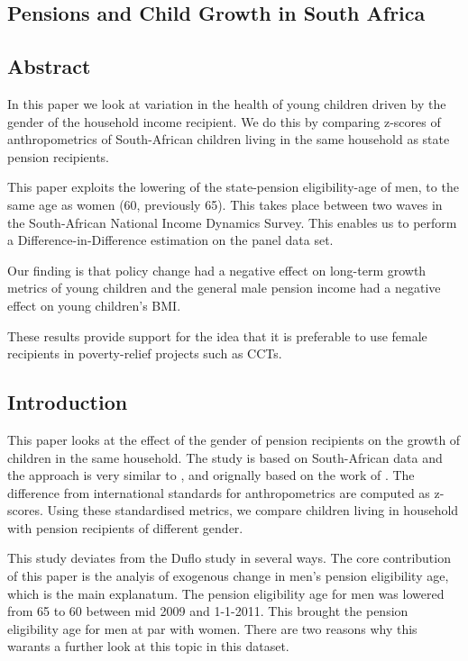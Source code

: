 \begin{refsection}
\chapter{Pensions and Child Growth in South Africa}
\label{sa}
\section*{Abstract}
In this paper we look at variation in the health of young children driven by the gender of the household income recipient.
We do this by comparing z-scores of anthropometrics of South-African children living in the same household as state pension recipients.

This paper exploits the lowering of the state-pension eligibility-age of men, 
to the same age as women (60, previously 65).
This takes place between two waves in the South-African National Income Dynamics Survey.
This enables us to perform a Difference-in-Difference estimation on the panel data set.

Our finding is that policy change had a negative effect on long-term growth metrics of young children
and the general male pension income had a negative effect on young children's BMI.

These results provide support for the idea that it is preferable to use female recipients in poverty-relief projects such as CCTs.
\pagebreak

\section{Introduction}
\label{sa:intro}
This paper looks at the effect of the gender of pension recipients on the growth of children in the same household.
The study is based on South-African data and the approach is very similar to \textcite{duflo2000child,duflo2003grandmothers},
and orignally based on the work of \textcite{thomas1994like}.
The difference from international standards \parencite[WHO Child Growth Standards]{who2006child} for anthropometrics are computed as z-scores.
Using these standardised metrics, we compare children living in household with pension recipients of different gender.

This study deviates from the Duflo study in several ways.
The core contribution of this paper is the analyis of exogenous change in men's pension eligibility age,
which is the main explanatum.
The pension eligibility age for men was lowered from 65 to 60 between mid 2009 and 1-1-2011.
This brought the pension eligibility age for men at par with women.
There are two reasons why this warants a further look at this topic in this dataset.


\end{refsection}
